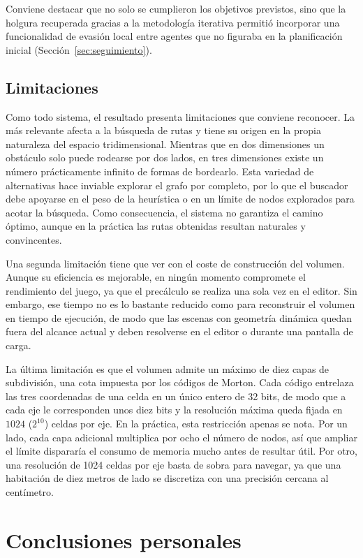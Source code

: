 Conviene destacar que no solo se cumplieron los objetivos previstos, sino que la holgura recuperada gracias a la metodología iterativa permitió incorporar una funcionalidad de evasión local entre agentes que no figuraba en la planificación inicial (Sección~\ref{sec:seguimiento}).

\subsection{Limitaciones}

Como todo sistema, el resultado presenta limitaciones que conviene reconocer.
La más relevante afecta a la búsqueda de rutas y tiene su origen en la propia naturaleza del espacio tridimensional.
Mientras que en dos dimensiones un obstáculo solo puede rodearse por dos lados, en tres dimensiones existe un número prácticamente infinito de formas de bordearlo.
Esta variedad de alternativas hace inviable explorar el grafo por completo, por lo que el buscador debe apoyarse en el peso de la heurística o en un límite de nodos explorados para acotar la búsqueda.
Como consecuencia, el sistema no garantiza el camino óptimo, aunque en la práctica las rutas obtenidas resultan naturales y convincentes.

Una segunda limitación tiene que ver con el coste de construcción del volumen.
Aunque su eficiencia es mejorable, en ningún momento compromete el rendimiento del juego, ya que el precálculo se realiza una sola vez en el editor.
Sin embargo, ese tiempo no es lo bastante reducido como para reconstruir el volumen en tiempo de ejecución, de modo que las escenas con geometría dinámica quedan fuera del alcance actual y deben resolverse en el editor o durante una pantalla de carga.

La última limitación es que el volumen admite un máximo de diez capas de subdivisión, una cota impuesta por los códigos de Morton.
Cada código entrelaza las tres coordenadas de una celda en un único entero de 32 bits, de modo que a cada eje le corresponden unos diez bits y la resolución máxima queda fijada en $1024$ ($2^{10}$) celdas por eje.
En la práctica, esta restricción apenas se nota.
Por un lado, cada capa adicional multiplica por ocho el número de nodos, así que ampliar el límite dispararía el consumo de memoria mucho antes de resultar útil.
Por otro, una resolución de 1024 celdas por eje basta de sobra para navegar, ya que una habitación de diez metros de lado se discretiza con una precisión cercana al centímetro.

\section{Conclusiones personales}

